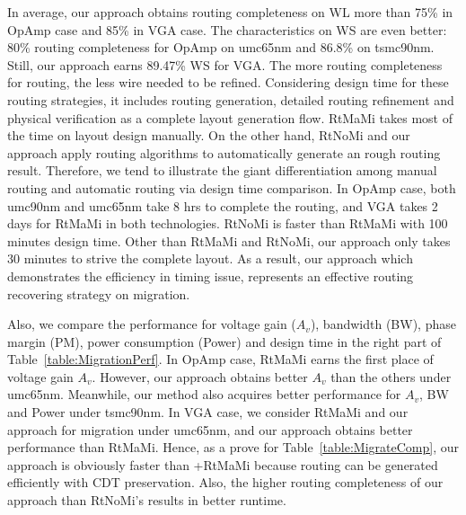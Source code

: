 \begin{table}
\begin{center}
\begin{tabular}{|c|c|c|c|c|c|c|c|c|c|c|c|}
        \end{tabular}
      \end{center}
    \end{table}

    In average, our approach obtains routing completeness on WL more than 75\% in OpAmp case and 85\% in VGA case. The characteristics on WS are even better: 80\% routing completeness for OpAmp on umc65nm and 86.8\% on tsmc90nm. Still, our approach earns 89.47\% WS for VGA. The more routing completeness for routing, the less wire needed to be refined. Considering design time for these routing strategies, it includes routing generation, detailed routing refinement and physical verification as a complete layout generation flow. RtMaMi takes most of the time on layout design manually. On the other hand, RtNoMi and our approach apply routing algorithms to automatically generate an rough routing result. Therefore, we tend to illustrate the giant differentiation among manual routing and automatic routing via design time comparison. In OpAmp case, both umc90nm and umc65nm take 8 hrs to complete the routing, and VGA takes 2 days for RtMaMi in both technologies. RtNoMi is faster than RtMaMi with 100 minutes design time. Other than RtMaMi and RtNoMi, our approach only takes 30 minutes to strive the complete layout. As a result, our approach which demonstrates the efficiency in timing issue, represents an effective routing recovering strategy on migration. 

    Also, we compare the performance for voltage gain ($A_v$), bandwidth (BW), phase margin (PM), power consumption (Power) and design time in the right part of Table~\ref{table:MigrationPerf}. In OpAmp case, RtMaMi earns the first place of voltage gain $A_v$. However, our approach obtains better $A_v$ than the others under umc65nm. Meanwhile, our method also acquires better performance for $A_v$, BW and Power under tsmc90nm. In VGA case, we consider RtMaMi and our approach for migration under umc65nm, and our approach obtains better performance than RtMaMi. Hence, as a prove for Table~\ref{table:MigrateComp}, our approach is obviously faster than \cite{msc-bhattacharya-tcad06}+RtMaMi because routing can be generated efficiently with CDT preservation. Also, the higher routing completeness of our approach than RtNoMi's results in better runtime.


